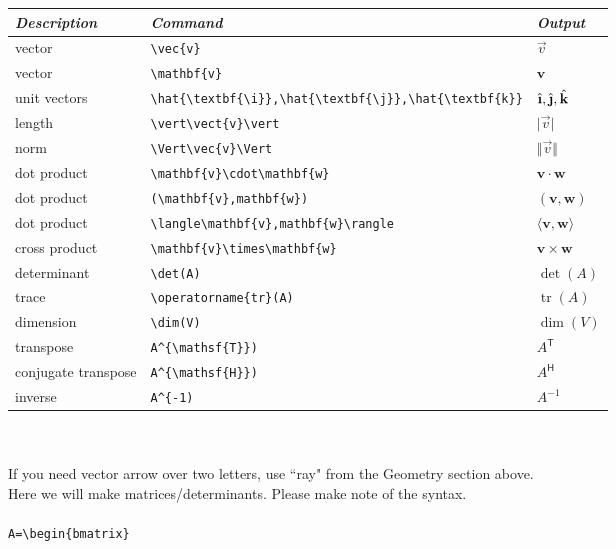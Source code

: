 \documentclass[12pt]{article}
\theoremstyle{definition}
\begin{document}
\begin{tabular}{| l | l | l |} \hline
\textit{Description} & \textit{Command} & \textit{Output}\\ \hline
vector & \verb!\vec{v}! & $\vec{v}$\\ \hline
vector & \verb!\mathbf{v}! & $\mathbf{v}$\\ \hline
unit vectors & \verb!\hat{\textbf{\i}},\hat{\textbf{\j}},\hat{\textbf{k}}! & $\hat{\textbf{\i}},\hat{\textbf{\j}},\hat{\textbf{k}}$\\ \hline  %
length & \verb!\vert\vect{v}\vert!& $\vert\vec{v}\vert$\\ \hline 
norm & \verb!\Vert\vec{v}\Vert! & $\Vert\vec{v}\Vert$\\ \hline  %
dot product & \verb!\mathbf{v}\cdot\mathbf{w}! & $\mathbf{v}\cdot\mathbf{w}$\\ \hline
dot product & \verb!(\mathbf{v},mathbf{w})! & $(\mathbf{v},\mathbf{w})$\\ \hline
dot product & \verb!\langle\mathbf{v},mathbf{w}\rangle! & $\langle\mathbf{v},\mathbf{w}\rangle$\\ \hline
cross product & \verb!\mathbf{v}\times\mathbf{w}! & $\mathbf{v}\times\mathbf{w}$\\ \hline
determinant & \verb!\det(A)! & $ \det(A)$\\ \hline
trace & \verb!\operatorname{tr}(A)! & $\operatorname{tr}(A)$\\ \hline
dimension & \verb!\dim(V)! & $\dim(V)$\\ \hline
transpose & \verb!A^{\mathsf{T}})! & $A^{\mathsf{T}}$\\ \hline
conjugate transpose & \verb!A^{\mathsf{H}})! & $A^{\mathsf{H}}$\\ \hline
inverse & \verb!A^{-1)! & $A^{-1}$\\ \hline
\end{tabular}
\\ \\If you need vector arrow over two letters, use ``ray" from the Geometry section above.
\\
\newpage
\noindent
Here we will make matrices/determinants.  Please make note of the syntax.\\ \\
\verb!A=\begin{bmatrix}!\\
\end{document}
